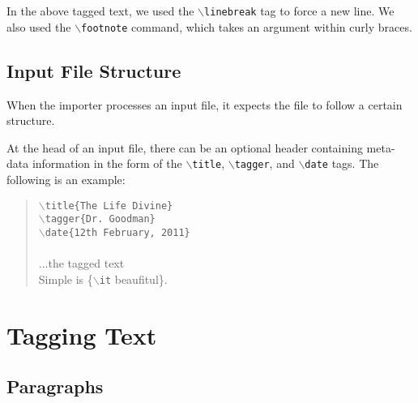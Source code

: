 \documentclass[11pt]{article}
\newcommand{\cmd}[1]{{\tt $\backslash$#1}}
\begin{document}
In the above tagged text, we used the \cmd{linebreak} tag to force a new
line. We also used the \cmd{footnote} command, which takes an argument
within curly braces.










\subsection{Input File Structure}

When the importer processes an input file, it expects the file to
follow a certain structure.

At the head of an input file, there can be an optional header
containing meta-data information in the form of the \cmd{title},
\cmd{tagger}, and \cmd{date} tags. The following is an example:

\begin{quote}
  \cmd{title\{The Life Divine\}}\\
  \cmd{tagger\{Dr. Goodman\}}\\
  \cmd{date\{12th February, 2011\}}\\
\\
  ...the tagged text \\
  Simple is \{\cmd{it} beaufitul\}.\\
\end{quote}


\section{Tagging Text}

\subsection{Paragraphs}
\end{document}
